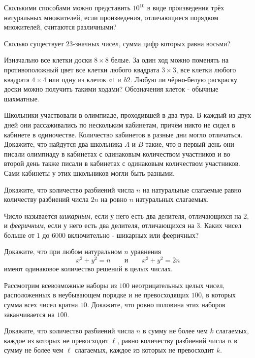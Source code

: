 \begin{problems}
\item Сколькими способами можно представить $10^{10}$ в виде произведения трёх натуральных множителей, если произведения, отличающиеся порядком множителей, считаются различными?

\item Сколько существует $23$-значных чисел, сумма цифр которых равна восьми?

\item Изначально все клетки доски $8\times8$ белые. За один ход можно поменять на противоположный цвет все клетки любого квадрата $3\times3$, все клетки любого квадрата $4\times4$ или одну из клеток $a1$ и $b2$. Любую ли чёрно-белую раскраску доски можно получить такими ходами? Обозначения клеток - обычные шахматные.

\item Школьники участвовали в олимпиаде, проходившей в два тура. В каждый из двух дней они рассаживались по нескольким кабинетам, причём никто не сидел в кабинете в одиночестве. Количество кабинетов в разные дни могло отличаться. Докажите, что найдутся два школьника $A$ и $B$ такие, что в первый день они писали олимпиаду в кабинетах с одинаковым количеством участников и во второй день также писали в кабинетах с одинаковым количеством участников. Сами кабинеты у этих школьников могли быть разными.

\item Докажите, что количество разбиений числа $n$ на натуральные слагаемые равно количеству разбиений числа $2n$ на ровно $n$ натуральных слагаемых.

\item Число называется \emph{шикарным}, если у него есть два делителя, отличающихся на $2$, и \emph{фееричным}, если у него есть два делителя, отличающихся на $3$. Каких чисел больше от $1$ до $6000$ включительно - шикарных или фееричных?

\item Докажите, что при любом натуральном $n$ уравнения
\[
x^2+y^2=n
\qquad\text{и}\qquad
x^2+y^2=2n
\]
имеют одинаковое количество решений в целых числах.

\item Рассмотрим всевозможные наборы из $100$ неотрицательных целых чисел, расположенных в неубывающем порядке и не превосходящих $100$, в которых сумма всех чисел кратна $10$. Докажите, что ровно половина этих наборов заканчивается на $100$.

\item Докажите, что количество разбиений числа $n$ в сумму не более чем $k$ слагаемых, каждое из которых не превосходит $\ell$, равно количеству разбиений числа $n$ в сумму не более чем $\ell$ слагаемых, каждое из которых не превосходит $k$.


\end{problems}
